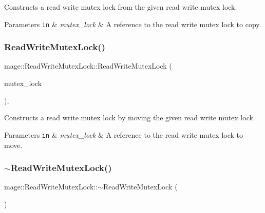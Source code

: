 Constructs a read write mutex lock from the given read write mutex lock.


\begin{DoxyParams}[1]{Parameters}
\mbox{\tt in}  & {\em mutex\+\_\+lock} & A reference to the read write mutex lock to copy. \\
\hline
\end{DoxyParams}
\hypertarget{classmage_1_1_read_write_mutex_lock_ac1c42cf89476d5e48e35d8b3fb05dc70}{}\label{classmage_1_1_read_write_mutex_lock_ac1c42cf89476d5e48e35d8b3fb05dc70} 
\subsubsection{\texorpdfstring{Read\+Write\+Mutex\+Lock()}{ReadWriteMutexLock()}\hspace{0.1cm}{\footnotesize\ttfamily [3/3]}}
{\footnotesize\ttfamily mage\+::\+Read\+Write\+Mutex\+Lock\+::\+Read\+Write\+Mutex\+Lock (\begin{DoxyParamCaption}\item[{\hyperlink{classmage_1_1_read_write_mutex_lock}{Read\+Write\+Mutex\+Lock} \&\&}]{mutex\+\_\+lock }\end{DoxyParamCaption})\hspace{0.3cm}{\ttfamily [default]}, {\ttfamily [noexcept]}}

Constructs a read write mutex lock by moving the given read write mutex lock.


\begin{DoxyParams}[1]{Parameters}
\mbox{\tt in}  & {\em mutex\+\_\+lock} & A reference to the read write mutex lock to move. \\
\hline
\end{DoxyParams}
\hypertarget{classmage_1_1_read_write_mutex_lock_a64b600234d29ba7307fcd77a17486582}{}\label{classmage_1_1_read_write_mutex_lock_a64b600234d29ba7307fcd77a17486582} 
\subsubsection{\texorpdfstring{$\sim$\+Read\+Write\+Mutex\+Lock()}{~ReadWriteMutexLock()}}
{\footnotesize\ttfamily mage\+::\+Read\+Write\+Mutex\+Lock\+::$\sim$\+Read\+Write\+Mutex\+Lock (\begin{DoxyParamCaption}{ }\end{DoxyParamCaption})}

